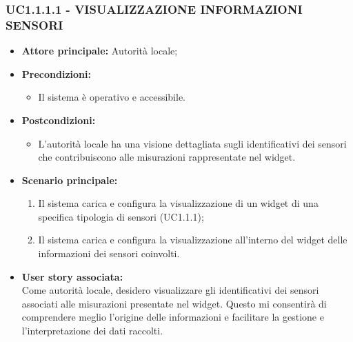\subsubsection{UC1.1.1.1 - VISUALIZZAZIONE INFORMAZIONI SENSORI}
\begin{itemize}
    \item \textbf{Attore principale:} Autorità locale;
    \item \textbf{Precondizioni:}
        \begin{itemize}
            \item Il sistema è operativo e accessibile.
        \end{itemize}
    \item \textbf{Postcondizioni:}
        \begin{itemize}
            \item L’autorità locale ha una visione dettagliata sugli identificativi dei sensori che contribuiscono alle misurazioni rappresentate nel widget.
        \end{itemize}
    \item \textbf{Scenario principale:}
        \begin{enumerate}
            \item Il sistema carica e configura la visualizzazione di un widget di una specifica tipologia di sensori (UC1.1.1);
            \item Il sistema carica e configura la visualizzazione all'interno del widget delle informazioni dei sensori coinvolti.
        \end{enumerate}
    \item \textbf{User story associata:} \\
        Come autorità locale, desidero visualizzare gli identificativi dei sensori associati alle misurazioni presentate nel widget. Questo mi consentirà di comprendere meglio l'origine delle informazioni e facilitare la gestione e l'interpretazione dei dati raccolti.
\end{itemize}

